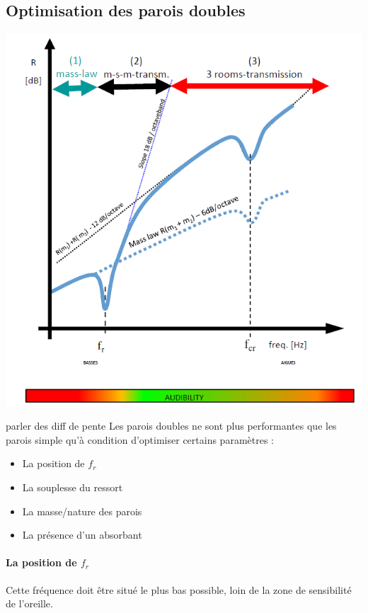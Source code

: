 \documentclass[11pt]{report}
\begin{document}
\subsection{Optimisation des parois doubles}
\begin{minipage}{0.4\linewidth}
\centering
\includegraphics[scale=0.3]{comp}
\end{minipage}
\begin{minipage}{0.55\linewidth}
parler des diff de pente
Les parois doubles ne sont plus performantes que les parois simple qu'à condition d'optimiser certains paramètres :
\begin{itemize}
\item La position de $f_r$
\item La souplesse du ressort
\item La masse/nature des parois
\item La présence d'un absorbant
\end{itemize}
\end{minipage}



\paragraph{La position de $f_r$} Cette fréquence doit être situé le plus bas possible, loin de la zone de sensibilité de l'oreille.\\
\end{document}
